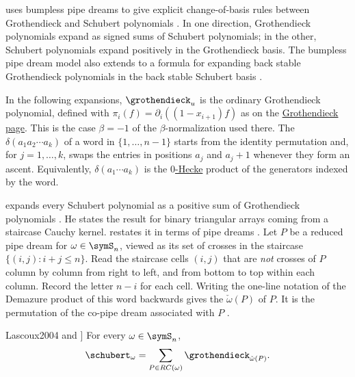  uses bumpless pipe dreams to give explicit change-of-basis
rules between Grothendieck and Schubert polynomials
\cite{Weigandt2025x}.  In one direction, Grothendieck polynomials expand as
signed sums of Schubert polynomials; in the other, Schubert polynomials expand
positively in the Grothendieck basis.  The bumpless pipe dream model also
extends to a formula for expanding back stable Grothendieck polynomials in the
back stable Schubert basis \cite[Thm.~8.1]{Weigandt2025x}.

In the following expansions, $\grothendieck_u$ is the ordinary Grothendieck
polynomial, defined with $\pi_i(f) = \partial_i((1-x_{i+1})f)$ as on the
\hyperref[grothendieckOperatorformula]{Grothendieck page}.  This is the case
$\beta = -1$ of the $\beta$-normalization used there.  The
\label{demazureProductWord} $\delta(a_1 a_2 \dotsm a_k)$ of a word
in $\{1,\dotsc,n-1\}$ starts from the identity permutation and, for
$j = 1, \dotsc, k$, swaps the entries in positions $a_j$ and $a_j+1$ whenever
they form an ascent.  Equivalently, $\delta(a_1 \dotsm a_k)$ is the
\hyperref[zeroHeckeAlgebra]{$0$-Hecke} product of the generators indexed by the word.

 expands every Schubert polynomial as a positive sum of
Grothendieck polynomials \cite[Thm.~4]{Lascoux2004}.  He states the result for
binary triangular arrays coming from a staircase Cauchy kernel.
 restates it in terms of pipe dreams
\cite[Thm.~1.6]{Weigandt2025x}.  Let $P$ be a reduced pipe dream for
$\omega \in \symS_n$, viewed as its set of crosses in the staircase
$\{(i,j) : i+j \leq n\}$.  Read the staircase cells $(i,j)$ that are
\emph{not} crosses of $P$ column by column from right to left, and from
bottom to top within each column.  Record the letter $n-i$ for each cell.
Writing the one-line notation of the Demazure product of this word backwards
gives the \label{pipeDreamCoPermutation}
$\check{\omega}(P)$ of $P$.  It is the permutation of the co-pipe dream
associated with $P$ \cite[Lem.~4.4 and Lem.~4.5]{Weigandt2025x}.

\begin{theorem}[Lascoux, see \cite[Thm.~4]{Lascoux2004} and \cite[Thm.~1.6]{Weigandt2025x}]
For every $\omega \in \symS_n$,
\[
  \schubert_\omega = \sum_{P \in RC(\omega)} \grothendieck_{\check{\omega}(P)}.
\]
\end{theorem}

